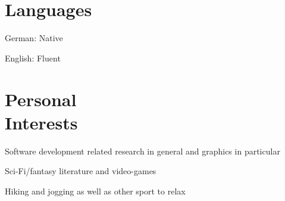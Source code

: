 \documentclass[margin,line]{Ofenberg_Resume}
\begin{document}
\begin{resume}
	\section{\mysidestyle Languages}
	\begin{list2}
		\item German: Native
		\item English: Fluent
	\end{list2}\vspace{-1.5mm}


	\section{\mysidestyle Personal\\Interests}
	\begin{list2}
		\item Software development related research in general and graphics in particular
		\item Sci-Fi/fantasy literature and video-games
		\item Hiking and jogging as well as other sport to relax
	\end{list2}\vspace{-1.5mm}


\end{resume}
\end{document}

